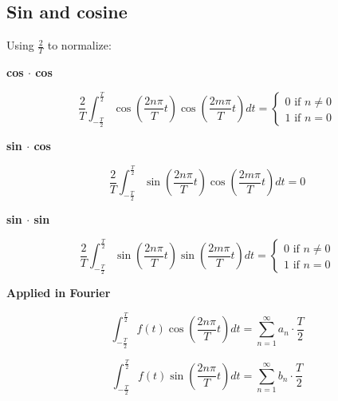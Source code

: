 \documentclass[letterpaper]{article}
\newcommand{\divline}{\noindent\makebox[\linewidth]{\rule{\textwidth}{0.4pt}}}
\begin{document}
        \begin{multicols}{2}
            \section{Sin and cosine}

                Using \(\frac{2}{T}\) to normalize:

                \textbf{cos \(\cdot\) cos}

                    \[ \frac{2}{T} \int_{-\frac{T}{2}}^{\frac{T}{2}} \cos{( \frac{2 n \pi}{T} t )} \cos{( \frac{2 m \pi}{T} t )} dt =
                        \begin{cases} 
					   0 \text{ if } n \neq 0 \\
					   1 \text{ if } n = 0
				    \end{cases}
                    \]

                \textbf{sin \(\cdot\) cos}

                    \[ \frac{2}{T} \int_{-\frac{T}{2}}^{\frac{T}{2}} \sin{( \frac{2 n \pi}{T} t )} \cos{( \frac{2 m \pi}{T} t )} dt = 0\]

                \textbf{sin \(\cdot\) sin}

                    \[ \frac{2}{T} \int_{-\frac{T}{2}}^{\frac{T}{2}} \sin{( \frac{2 n \pi}{T} t )} \sin{( \frac{2 m \pi}{T} t )} dt =
                        \begin{cases} 
					   0 \text{ if } n \neq 0 \\
					   1 \text{ if } n = 0
				    \end{cases}
                    \]

                \textbf{Applied in Fourier}

                    \[ \int_{-\frac{T}{2}}^{\frac{T}{2}} f(t) \cos{( \frac{2 n \pi}{T} t )} dt = \sum_{n = 1}^{\infty} a_{n} \cdot \frac{T}{2} \]

                    \[ \int_{-\frac{T}{2}}^{\frac{T}{2}} f(t) \sin{( \frac{2 n \pi}{T} t )} dt = \sum_{n = 1}^{\infty} b_{n} \cdot \frac{T}{2} \]

        \end{multicols}

        \divline
\end{document}

